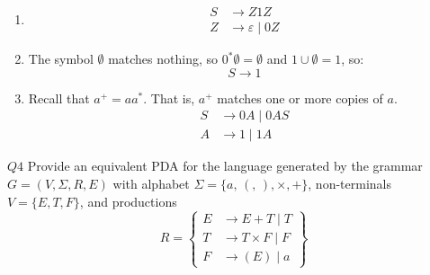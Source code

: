 \documentclass{article}
\theoremstyle{definition}
\theoremstyle{definition}
\theoremstyle{remark}
\begin{document}
\begin{enumerate}
    \item[$(i)$]\hspace*{1cm}
    \begin{align*}
        S&\longrightarrow Z1Z\\
        Z&\longrightarrow\varepsilon\mid0Z
    \end{align*}
    
    \item[$(ii)$] The symbol $\emptyset$ matches nothing, so $0^\ast\emptyset=\emptyset$ and $1\cup\emptyset=1$, so:
    \begin{equation*}
        S\longrightarrow1
    \end{equation*}

    \item[$(iii)$] Recall that $a^+=aa^\ast$. That is, $a^+$ matches one or more copies of $a$.
    \begin{align*}
        S&\longrightarrow0A\mid0AS\\
        A&\longrightarrow1\mid1A
    \end{align*}
\end{enumerate}








\begin{questionbox}{$Q4$}
    Provide an equivalent PDA for the language generated by the grammar $G=(V,\Sigma,R,E)$ with alphabet $\Sigma=\bigl\{a,\,(,\,),\times,+\bigr\}$, non-terminals $V=\{E,T,F\}$, and productions
    \begin{equation*}
        R=\left\{\begin{aligned}
            E&\longrightarrow E+T\mid T\\
            T&\longrightarrow T\times F\mid F\\
            F&\longrightarrow (E)\mid a
        \end{aligned}\right\}
    \end{equation*}
\end{questionbox}

\bigskip
\end{document}

